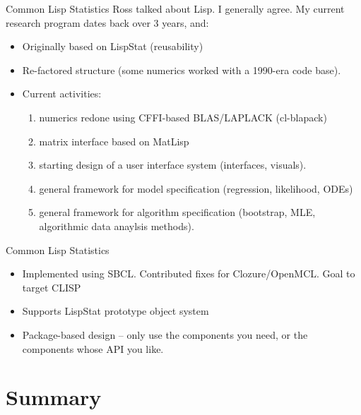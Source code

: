 \documentclass{beamer}
\begin{document}
\begin{frame}{Common Lisp Statistics}
  Ross talked about Lisp.   I generally agree.  My current
  research program dates back over 3 years, and:
  \begin{itemize}
  \item Originally based on LispStat (reusability)
  \item Re-factored structure (some numerics worked with a 1990-era code base). 
  \item Current activities:
    \begin{enumerate}
    \item numerics redone using CFFI-based BLAS/LAPLACK (cl-blapack)
    \item matrix interface based on MatLisp
    \item starting design of a user interface system (interfaces,
      visuals).
    \item general framework for model specification (regression,
      likelihood, ODEs)
    \item general framework for algorithm specification (bootstrap,
      MLE, algorithmic data anaylsis methods).
    \end{enumerate}
  \end{itemize}
\end{frame}

\begin{frame}{Common Lisp Statistics}

  \begin{itemize}
  \item Implemented using SBCL.  Contributed fixes for
    Clozure/OpenMCL. Goal to target CLISP
  \item Supports LispStat prototype object system
  \item Package-based design -- only use the components you need, or
    the components whose API you like.
  \end{itemize}
\end{frame}
\section*{Summary}

\end{document}
